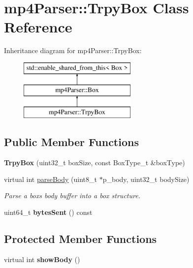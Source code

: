 \hypertarget{classmp4_parser_1_1_trpy_box}{}\section{mp4\+Parser\+::Trpy\+Box Class Reference}
\label{classmp4_parser_1_1_trpy_box}
Inheritance diagram for mp4\+Parser\+::Trpy\+Box\+:\begin{figure}[H]
\begin{center}
\leavevmode
\includegraphics[height=3.000000cm]{classmp4_parser_1_1_trpy_box}
\end{center}
\end{figure}
\subsection*{Public Member Functions}
\begin{DoxyCompactItemize}
\item 
\mbox{\label{classmp4_parser_1_1_trpy_box_ae3b014108083b39d0cefb1f76598d100}} 
{\bfseries Trpy\+Box} (uint32\+\_\+t box\+Size, const Box\+Type\+\_\+t \&box\+Type)
\item 
virtual int \mbox{\hyperlink{classmp4_parser_1_1_trpy_box_a15efae09d81df73b14bb59039452785d}{parse\+Body}} (uint8\+\_\+t $\ast$p\+\_\+body, uint32\+\_\+t body\+Size)
\begin{DoxyCompactList}\small\item\em Parse a box\textquotesingle{}s body buffer into a box structure. \end{DoxyCompactList}\item 
\mbox{\label{classmp4_parser_1_1_trpy_box_af5edf0769d58f866e3b2b118bc9f23a4}} 
uint64\+\_\+t {\bfseries bytes\+Sent} () const
\end{DoxyCompactItemize}
\subsection*{Protected Member Functions}
\begin{DoxyCompactItemize}
\item 
\mbox{\label{classmp4_parser_1_1_trpy_box_aea5c0dd3523f8a6f4d5a800c93ae346b}} 
virtual int {\bfseries show\+Body} ()
\end{DoxyCompactItemize}
